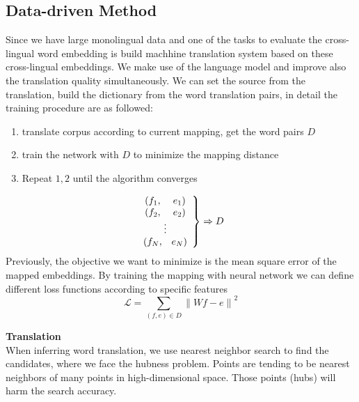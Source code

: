 \subsection{Data-driven Method}
Since we have large monolingual data and one of the tasks to evaluate the cross-lingual word embedding is build machhine translation system based on these cross-lingual embeddings. We make use of the language model and improve also the translation quality simultaneously. We can set the source from the translation, build the dictionary from the word translation pairs, in detail the training procedure are as followed:
\begin{enumerate}
	\item translate corpus according to current mapping, get the word pairs $D$
	\item train the network with $D$ to minimize the mapping distance
	\item Repeat $1,2$ until the algorithm converges
\end{enumerate}
		\[ 
		\left. \begin{array}{c c} 
		(f_1,& e_1)\\
		(f_2,& e_2)\\
		\multicolumn{2}{c}{\vdots}\\
		(f_N,& e_N)
		\end{array} \right\} 
		\Rightarrow D
		\]
Previously, the objective we want to minimize is the mean square error of the mapped embeddings. By training the mapping with neural network we can define different loss functions according to specific features
		\[\mathcal{L} = \sum_{(f,e)\in D} {\lVert Wf - e \rVert}^2  \]


\textbf{Translation}\\
When inferring word translation, we use nearest neighbor search to find the candidates, where we face the hubness problem. 
Points are tending to be nearest neighbors of many points in high-dimensional space.  Those points (hubs) will harm the search accuracy.\\

